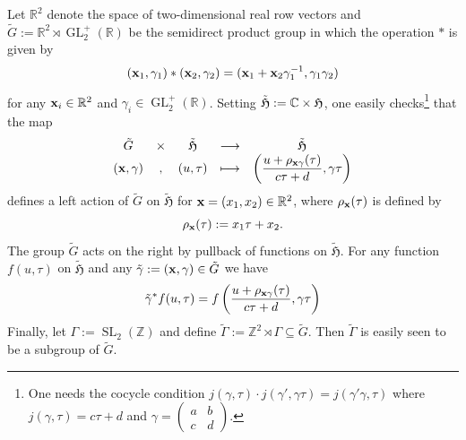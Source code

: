\documentclass[12pt,amstex,amssymb]{article}
\theoremstyle{plain}
\theoremstyle{definition}
\def\lra{\longrightarrow}
\def\g{\gamma}
\def\fH{{\frak H}}
\def\Z{{\mathbb Z}}
\def\R{{\mathbb R}}
\def\C{{\mathbb C}}
\def\Q{{\mathbb Q}}
\def\bx {{\bf x}}
\def\g{\gamma}
\newcommand{\bea}{\begin{eqnarray}}
\newcommand{\eea}{\end{eqnarray}}
\newcommand{\GL}{\operatorname{GL}}
\newcommand{\SL}{\operatorname{SL}}
\newcommand{\ba}{\mathbf{a}}
\newcommand{\bb}{\mathbf{b}}
\newcommand{\tfH}{\tilde{\mathfrak{H}}}
\begin{document}
Let $\R^2$ denote the space of two-dimensional real row vectors and $\tilde G := \R^2 \rtimes \GL^+_2(\R)$ be the semidirect product group in which the operation $\ast$ is given by
$$
(\bx_1,\gamma_1)\ast (\bx_2,\gamma_2) = (\bx_1 + \bx_2\gamma_1^{-1}, \gamma_1\gamma_2)
$$
for any $\bx_i\in \R^2$ and $\gamma_i \in \GL^+_2(\R)$.   Setting $\tfH := \C \times \fH$, one easily checks\footnote{One needs the cocycle condition $j(\g,\tau)\cdot j(\g', \g\tau)=j(\g'\g, \tau)$ where $j(\g,\tau)=c\tau +d$ and $\g=\begin{pmatrix}a&b\\c&d\end{pmatrix}$.} that the map
\bea \label{saction}
\begin{array}{ccccc}
	\tilde G &\times& \tfH &\lra&\tfH \\
	(\bx,\gamma)&,& (u,\tau)&\longmapsto& \biggl(\displaystyle\frac{u+\rho_{\bx\gamma}(\tau)}{c\tau + d}, \gamma\tau\biggr)\\
\end{array}
\eea
defines a left action of $\tilde G$ on $\tfH$ for $\bx = (x_1,x_2)\in \R^2$, where $\rho_\bx(\tau)$ is defined by
$$
\rho_\bx(\tau) := x_1\tau + x_2.
$$ 
The group $\tilde G$ acts on the right by pullback of functions on $\tfH$.
For any function $f(u,\tau)$ on $\tfH$ and any $\tilde\gamma := (\bx,\gamma)\in \tilde G$ we have
$$
\tilde\gamma^\ast f(u,\tau) = f\left(\frac{u + \rho_{\bx\gamma}(\tau)}{c\tau +d},\gamma\tau\right)
$$
Finally, let $\Gamma := \SL_2(\Z)$ and define $\tilde\Gamma := \Z^2 \rtimes \Gamma \subseteq \tilde G$.   Then $\tilde\Gamma$
is easily seen to be a subgroup of $\tilde G$.   

%
\end{document}

